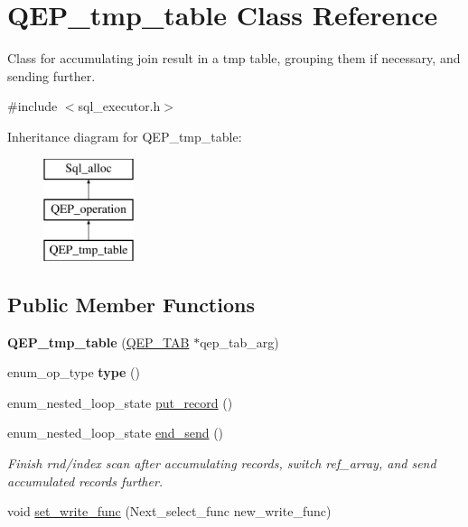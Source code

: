 \hypertarget{classQEP__tmp__table}{}\section{Q\+E\+P\+\_\+tmp\+\_\+table Class Reference}
\label{classQEP__tmp__table}


Class for accumulating join result in a tmp table, grouping them if necessary, and sending further.  




{\ttfamily \#include $<$sql\+\_\+executor.\+h$>$}

Inheritance diagram for Q\+E\+P\+\_\+tmp\+\_\+table\+:\begin{figure}[H]
\begin{center}
\leavevmode
\includegraphics[height=3.000000cm]{classQEP__tmp__table}
\end{center}
\end{figure}
\subsection*{Public Member Functions}
\begin{DoxyCompactItemize}
\item 
\mbox{\label{classQEP__tmp__table_aaef513c1b36da60071b5c9831166daf6}} 
{\bfseries Q\+E\+P\+\_\+tmp\+\_\+table} (\mbox{\hyperlink{classQEP__TAB}{Q\+E\+P\+\_\+\+T\+AB}} $\ast$qep\+\_\+tab\+\_\+arg)
\item 
\mbox{\label{classQEP__tmp__table_a436ee576b42863661f6ae6e286409098}} 
enum\+\_\+op\+\_\+type {\bfseries type} ()
\item 
enum\+\_\+nested\+\_\+loop\+\_\+state \mbox{\hyperlink{classQEP__tmp__table_ad402039d362a460ab3b4f7035cd843ce}{put\+\_\+record}} ()
\item 
enum\+\_\+nested\+\_\+loop\+\_\+state \mbox{\hyperlink{group__Query__Executor_ga1cbaa4a44140f41c161eaab87c25f473}{end\+\_\+send}} ()
\begin{DoxyCompactList}\small\item\em Finish rnd/index scan after accumulating records, switch ref\+\_\+array, and send accumulated records further. \end{DoxyCompactList}\item 
void \mbox{\hyperlink{classQEP__tmp__table_a4b658910c518a85ddf9c3640463dac18}{set\+\_\+write\+\_\+func}} (Next\+\_\+select\+\_\+func new\+\_\+write\+\_\+func)
\end{DoxyCompactItemize}
